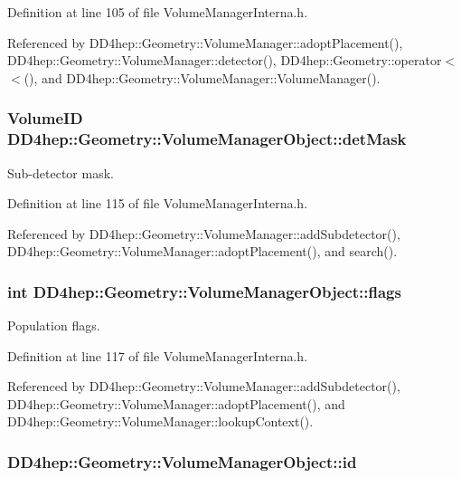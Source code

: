 Definition at line 105 of file VolumeManagerInterna.h.

Referenced by DD4hep::Geometry::VolumeManager::adoptPlacement(), DD4hep::Geometry::VolumeManager::detector(), DD4hep::Geometry::operator$<$$<$(), and DD4hep::Geometry::VolumeManager::VolumeManager().\hypertarget{class_d_d4hep_1_1_geometry_1_1_volume_manager_object_aee03c6af6623d5d678c7cb870021e974}{
\subsubsection[{detMask}]{\setlength{\rightskip}{0pt plus 5cm}VolumeID {\bf DD4hep::Geometry::VolumeManagerObject::detMask}}}
\label{class_d_d4hep_1_1_geometry_1_1_volume_manager_object_aee03c6af6623d5d678c7cb870021e974}


Sub-\/detector mask. 

Definition at line 115 of file VolumeManagerInterna.h.

Referenced by DD4hep::Geometry::VolumeManager::addSubdetector(), DD4hep::Geometry::VolumeManager::adoptPlacement(), and search().\hypertarget{class_d_d4hep_1_1_geometry_1_1_volume_manager_object_abe994d6c29e62e21c1fd2d2be21d041d}{
\subsubsection[{flags}]{\setlength{\rightskip}{0pt plus 5cm}int {\bf DD4hep::Geometry::VolumeManagerObject::flags}}}
\label{class_d_d4hep_1_1_geometry_1_1_volume_manager_object_abe994d6c29e62e21c1fd2d2be21d041d}


Population flags. 

Definition at line 117 of file VolumeManagerInterna.h.

Referenced by DD4hep::Geometry::VolumeManager::addSubdetector(), DD4hep::Geometry::VolumeManager::adoptPlacement(), and DD4hep::Geometry::VolumeManager::lookupContext().\hypertarget{class_d_d4hep_1_1_geometry_1_1_volume_manager_object_a34cf251ba79ecddf50f9fdaf50265968}{
\subsubsection[{id}]{ {\bf DD4hep::Geometry::VolumeManagerObject::id}}}
\label{class_d_d4hep_1_1_geometry_1_1_volume_manager_object_a34cf251ba79ecddf50f9fdaf50265968}


